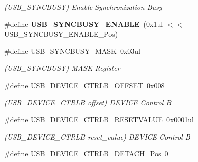 \begin{DoxyCompactItemize}
\begin{DoxyCompactList}\small\item\em (U\+S\+B\+\_\+\+S\+Y\+N\+C\+B\+U\+S\+Y) Enable Synchronization Busy \end{DoxyCompactList}\item 
\hypertarget{group___s_a_m_l21___u_s_b_ga4a0cb63150b0dbeb50d0f0420bde6351}{}\#define {\bfseries U\+S\+B\+\_\+\+S\+Y\+N\+C\+B\+U\+S\+Y\+\_\+\+E\+N\+A\+B\+L\+E}~(0x1ul $<$$<$ U\+S\+B\+\_\+\+S\+Y\+N\+C\+B\+U\+S\+Y\+\_\+\+E\+N\+A\+B\+L\+E\+\_\+\+Pos)\label{group___s_a_m_l21___u_s_b_ga4a0cb63150b0dbeb50d0f0420bde6351}

\item 
\hypertarget{group___s_a_m_l21___u_s_b_gad1ba325956578c9e9ba3bceb8e2a7b5c}{}\#define \hyperlink{group___s_a_m_l21___u_s_b_gad1ba325956578c9e9ba3bceb8e2a7b5c}{U\+S\+B\+\_\+\+S\+Y\+N\+C\+B\+U\+S\+Y\+\_\+\+M\+A\+S\+K}~0x03ul\label{group___s_a_m_l21___u_s_b_gad1ba325956578c9e9ba3bceb8e2a7b5c}

\begin{DoxyCompactList}\small\item\em (U\+S\+B\+\_\+\+S\+Y\+N\+C\+B\+U\+S\+Y) M\+A\+S\+K Register \end{DoxyCompactList}\item 
\hypertarget{group___s_a_m_l21___u_s_b_ga028b62303469fa5a44be441bedd526ee}{}\#define \hyperlink{group___s_a_m_l21___u_s_b_ga028b62303469fa5a44be441bedd526ee}{U\+S\+B\+\_\+\+D\+E\+V\+I\+C\+E\+\_\+\+C\+T\+R\+L\+B\+\_\+\+O\+F\+F\+S\+E\+T}~0x008\label{group___s_a_m_l21___u_s_b_ga028b62303469fa5a44be441bedd526ee}

\begin{DoxyCompactList}\small\item\em (U\+S\+B\+\_\+\+D\+E\+V\+I\+C\+E\+\_\+\+C\+T\+R\+L\+B offset) D\+E\+V\+I\+C\+E Control B \end{DoxyCompactList}\item 
\hypertarget{group___s_a_m_l21___u_s_b_gae17314f9012df5bc745f010f0ebbfb4c}{}\#define \hyperlink{group___s_a_m_l21___u_s_b_gae17314f9012df5bc745f010f0ebbfb4c}{U\+S\+B\+\_\+\+D\+E\+V\+I\+C\+E\+\_\+\+C\+T\+R\+L\+B\+\_\+\+R\+E\+S\+E\+T\+V\+A\+L\+U\+E}~0x0001ul\label{group___s_a_m_l21___u_s_b_gae17314f9012df5bc745f010f0ebbfb4c}

\begin{DoxyCompactList}\small\item\em (U\+S\+B\+\_\+\+D\+E\+V\+I\+C\+E\+\_\+\+C\+T\+R\+L\+B reset\+\_\+value) D\+E\+V\+I\+C\+E Control B \end{DoxyCompactList}\item 
\hypertarget{group___s_a_m_l21___u_s_b_gad8373344db8aa0727646a15cfc34ebd3}{}\#define \hyperlink{group___s_a_m_l21___u_s_b_gad8373344db8aa0727646a15cfc34ebd3}{U\+S\+B\+\_\+\+D\+E\+V\+I\+C\+E\+\_\+\+C\+T\+R\+L\+B\+\_\+\+D\+E\+T\+A\+C\+H\+\_\+\+Pos}~0\label{group___s_a_m_l21___u_s_b_gad8373344db8aa0727646a15cfc34ebd3}


\end{DoxyCompactItemize}
